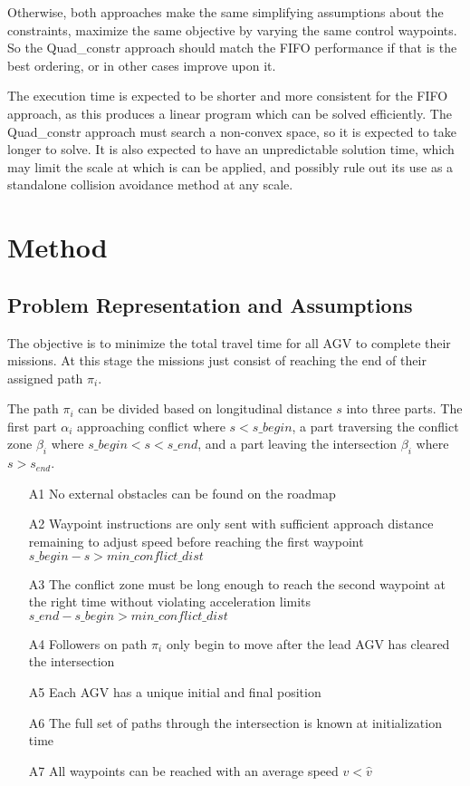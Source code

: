 \documentclass[11pt]{article} %
\begin{document}
Otherwise, both approaches make the same simplifying assumptions about the constraints, maximize the same objective by varying the same control waypoints. So the Quad\_constr approach should match the FIFO performance if that is the best ordering, or in other cases improve upon it.

The execution time is expected to be shorter and more consistent for the FIFO approach, as this produces a linear program which can be solved efficiently. The Quad\_constr approach must search a non-convex space, so it is expected to take longer to solve. It is also expected to have an unpredictable solution time, which may limit the scale at which is can be applied, and possibly rule out its use as a  standalone collision avoidance method at any scale.

\section{Method}
\subsection{Problem Representation and Assumptions}
The objective is to minimize the total travel time for all AGV to complete their missions. At this stage the missions just consist of reaching the end of their assigned path $\pi_i$. 

The path $\pi_i$ can be divided based on longitudinal distance $s$ into three parts. The first part $\alpha_i$ approaching conflict where $s<s\_begin$, a part traversing the conflict zone $\beta_i$ where $s\_begin < s < s\_end$, and a part leaving the intersection $\beta_i$ where $s >s_{end}$. 

\begin{itemize}
\item[A1] No external obstacles can be found on the roadmap
\item[A2] Waypoint instructions are only sent with sufficient approach distance remaining to adjust speed  before reaching the first waypoint  $s\_begin - s > min\_conflict\_dist$ 
\item[A3] The conflict zone must be long enough to reach the second waypoint at the right time without violating acceleration limits $s\_end - s\_begin > min\_conflict\_dist$ 
\item[A4] Followers on path $\pi_i$ only begin to move after the lead AGV has cleared the intersection 
\item[A5] Each AGV has a unique initial and final position
\item[A6] The full set of paths through the intersection is known at initialization time
\item[A7] All waypoints can be reached with an average speed $v < \hat{v}$
\end{itemize}
\end{document}
